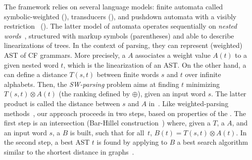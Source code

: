 %
%
The framework relies on several language models:
finite automata called symbolic-weighted (\SWA),
transducers (\SWT), and pushdown automata
with a visibly restriction~\cite{AlurMadhusudan09nested} (\SWVPA).
The latter model of automata operates sequentially on \emph{nested words}~\cite{AlurMadhusudan09nested},
structured with markup symbols (parentheses) and able to describe linearizations of trees.
%
In the context of parsing, they can represent (weighted) AST of CF grammars.
More precisely, a \SWVPA $A$ associates a weight value $A(t)$ %
to a given nested word $t$, which is the linearization of an AST. %
%
On the other hand,
a \SWT can define a distance $T(s, t)$ between finite words $s$ and $t$
over infinite alphabets. %
Then, the \emph{SW-parsing} problem aims at %
finding $t$ minimizing
$T(s, t) \otimes A(t)$ (\wrt the ranking defined by $\oplus$), given an input word $s$.
The latter product is called the distance between $s$ and $A$ in~\cite{Mohri03EDWA}.
%
Like weighted-parsing
methods~\cite{Goodman99SemiringParsing,Nederhof03weightedParsing,MorbitzVogler19weighted-parsing},
our approach proceeds in two steps,
based on properties of the \swM.
The first step is an intersection
(Bar-Hillel construction~\cite{GruneJacobs08parsing})
where, given a \SWT $T$, a \SWVPA $A$, and an input word $s$,
a \SWVPA $B$ %
is built, such that for all~$t$,
$B(t) = T(s, t) \otimes A(t)$.%
In the second step, a best AST $t$ is found by applying to $B$ %
a best search algorithm similar to the shortest distance
in graphs~\cite{Mohri02semiring,Huang05kbest}.
%


